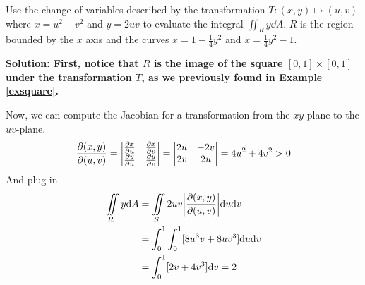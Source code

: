 \begin{example}
    Use the change of variables described by the transformation $T: (x,y)\mapsto(u,v)$ where $x = u^2-v^2$ and $y = 2uv$ to evaluate the integral $\iint_R y\dd A$. $R$ is the region bounded by the $x$ axis and the curves $x = 1-\frac{1}{4}y^2$ and $x=\frac{1}{4}y^2-1$. \par
    \bf{Solution:} First, notice that $R$ is the image of the square $[0,1]\times[0,1]$ under the transformation $T$, as we previously found in Example \ref{exsquare}. \par
    Now, we can compute the Jacobian for a transformation from the $xy$-plane to the $uv$-plane.
    \[ \pdv{(x,y)}{(u,v)} = \begin{vmatrix}
        \pdv{x}{u} & \pdv{x}{v} \\
        \pdv{y}{u} & \pdv{y}{v}
    \end{vmatrix} = \begin{vmatrix}
        2u & -2v \\
        2v & 2u
    \end{vmatrix} = 4u^2+4v^2 > 0\]
    And plug in.
    \begin{align*}
        \iint\limits_R y\dd A &= \iint\limits_S 2uv\abs{\pdv{(x,y)}{(u,v)}}\dd u \dd v \\
        &= \int_0^1\int_0^1 [8u^3v+8uv^3]\dd u \dd v \\
        &= \int_0^1 [2v + 4v^3]\dd v = 2 
    \end{align*}
\end{example}
